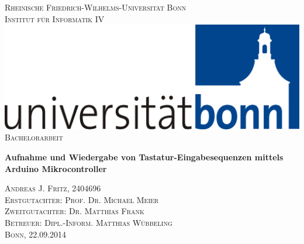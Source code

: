 \documentclass[11pt, a4paper]{report}
\begin{document}
  \begin{titlepage}
    \thispagestyle{empty}
    \begin{center}
      \textsc{\large Rheinische Friedrich-Wilhelms-Universität Bonn}\\[1pc]
      \textsc{\large Institut für Informatik IV}\\[2pc]
      \includegraphics[scale=0.07]{images/logo}\\
      \vspace*{\fill}
      \textsc{\large Bachelorarbeit}\\[3pc]
      \begin{spacing}{2}
        \textbf{\LARGE Aufnahme und Wiedergabe von Tastatur-Eingabesequenzen mittels Arduino Mikrocontroller}\\[3pc]
      \end{spacing}
      \textsc{\large Andreas J. Fritz, 2404696}\\
      \vspace*{\fill}
      \textsc{\large Erstgutachter: Prof. Dr. Michael Meier}\\[1pc]
      \textsc{\large Zweitgutachter: Dr. Matthias Frank}\\[1pc]
      \textsc{\large Betreuer: Dipl.-Inform. Matthias Wübbeling}\\[1pc]
      \textsc{\large Bonn, 22.09.2014}
    \end{center}
  \end{titlepage}
\end{document}
